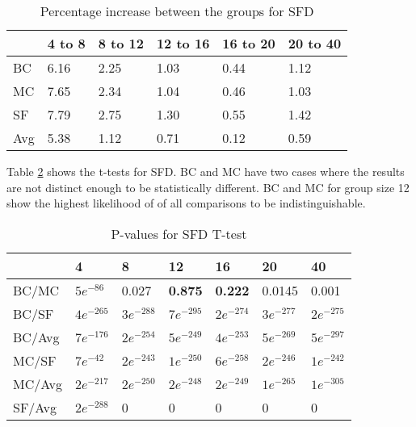 \begin{table}[H]
	\centering
	\begin{tabular}{|l|lllll|}\hline
		& 4 to 8 & 8 to 12 & 12 to 16 & 16 to 20 & 20 to 40 \\ \hline
		BC 	& 6.16	& 2.25	& 1.03	& 0.44	& 1.12 \\
		MC  & 7.65	& 2.34	& 1.04	& 0.46	& 1.03 \\
		SF  & 7.79	& 2.75	& 1.30	& 0.55	& 1.42 \\
		Avg	& 5.38	& 1.12	& 0.71	& 0.12	& 0.59 \\ \hline
	\end{tabular}
	\caption{Percentage increase between the groups for SFD}
	\label{tbl:sfd}
\end{table}

Table \ref{tbl:sfd_ttest} shows the t-tests for SFD. BC and MC have two cases where the results are not distinct enough to be statistically different. BC and MC for group size 12 show the highest likelihood of of all comparisons to be indistinguishable.

\begin{table}[H]
	\centering
	\begin{tabular}{|l|llllll|}\hline
		& 4 & 8 & 12 & 16 & 20 & 40 \\\hline
		BC/MC	& $5e^{-86}$	& 0.027	& \textbf{0.875}	& \textbf{0.222}	& 0.0145 & 0.001 \\
		BC/SF	& $4e^{-265}$	& $3e^{-288}$	& $7e^{-295}$	& $2e^{-274}$	& $3e^{-277}$ & $2e^{-275}$ \\
		BC/Avg	& $7e^{-176}$	& $2e^{-254}$	& $5e^{-249}$	& $4e^{-253}$	& $5e^{-269}$ & $5e^{-297}$ \\
		MC/SF	& $7e^{-42}$	& $2e^{-243}$ 	& $1e^{-250}$	& $6e^{-258}$	& $2e^{-246}$ & $1e^{-242}$ \\
		MC/Avg	& $2e^{-217}$	& $2e^{-250}$ 	& $2e^{-248}$	& $2e^{-249}$	& $1e^{-265}$ & $1e^{-305}$ \\
		SF/Avg	& $2e^{-288}$	& 0	& 0	& 0	& 0 & 0 \\ \hline
	\end{tabular}
	\caption{P-values for SFD T-test}
	\label{tbl:sfd_ttest}
\end{table}